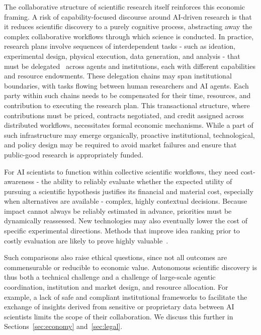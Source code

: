 \documentclass[11pt, a4paper, twocolumn, goog]{google}
\begin{document}
The collaborative structure of scientific research itself reinforces this economic framing. A risk of capability-focused discourse around AI-driven research is that it reduces scientific discovery to a purely cognitive process, abstracting away the complex collaborative workflows through which science is conducted. In practice, research plans involve sequences of interdependent tasks - such as ideation, experimental design, physical execution, data generation, and analysis - that must be delegated~\citep{tomasev2026intelligentaidelegation} across agents and institutions, each with different capabilities and resource endowments. These delegation chains may span institutional boundaries, with tasks flowing between human researchers and AI agents. Each party within such chains needs to be compensated for their time, resources, and contribution to executing the research plan. This transactional structure, where contributions must be priced, contracts negotiated, and credit assigned across distributed workflows, necessitates formal economic mechanisms. While a part of such infrastructure may emerge organically, proactive institutional, technological, and policy design may be required to avoid market failures and ensure that public-good research is appropriately funded.

For AI scientists to function within collective scientific workflows, they need cost-awareness - the ability to reliably evaluate whether the expected utility of pursuing a scientific hypothesis justifies its financial and material cost, especially when alternatives are available - complex, highly contextual decisions. Because impact cannot always be reliably estimated in advance, priorities must be dynamically reassessed. New technologies may also eventually lower the cost of specific experimental directions. Methods that improve idea ranking prior to costly evaluation are likely to prove highly valuable~\citep{foster2026airesearchpreferencemodels}.

Such comparisons also raise ethical questions, since not all outcomes are commensurable or reducible to economic value. Autonomous scientific discovery is thus both a technical challenge and a challenge of large-scale agentic coordination, institution and market design, and resource allocation. For example, a lack of safe and compliant institutional frameworks to facilitate the exchange of insights derived from sensitive or proprietary data between AI scientists limits the scope of their collaboration. We discuss this further in Sections~\ref{sec:economy} and~\ref{sec:legal}.
\end{document}
